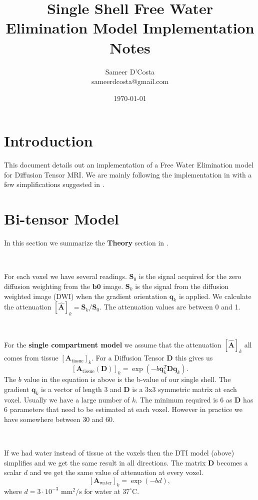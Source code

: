 \documentclass[12pt]{article}
\title{Single Shell Free Water Elimination Model Implementation Notes
}
\author{
  Sameer D'Costa \\
    sameerdcosta@gmail.com
}
\date{\today}
\newcommand{\vect}[1]{\mathbf{#1}}
\begin{document}
\maketitle

\section{Introduction}
This document details out an implementation of a Free Water Elimination model
for Diffusion Tensor MRI. We are mainly following the implementation in
\cite{Pasternak2009} with a few simplifications suggested in \cite{Pasternak2014}.

\section{Bi-tensor Model}
In this section we summarize the \textbf{Theory} section in
\cite{Pasternak2009}. 

\ 

\noindent
For each voxel we have several readings. $\vect{S}_0$ is the signal acquired
for the zero diffusion weighting from the $\vect{b0}$ image. $\vect{S}_k$ is
the signal from the diffusion weighted image (DWI) when the gradient
orientation $\vect{q}_k$ is applied. We calculate the attenuation
$[\hat{\vect{A}}]_k = \vect{S}_k / \vect{S}_0$. The attenuation values are
between 0 and 1. 

\ 

\noindent
For the \textbf{single compartment model} we assume that the attenuation
$[\hat{\vect{A}}]_k$ all comes from tissue $[\vect{A}_{\text{tissue}}]_k$. For a Diffusion Tensor $\vect{D}$ this gives us 
$$[\vect{A}_{\text{tissue}}(\vect{D})]_k = \exp(-b
\vect{q}_k^T\vect{D}\vect{q}_k).$$
The $b$ value in the equation is above is the b-value of our single shell. The
gradient $\vect{q}_k$ is a vector of length 3 and $\vect{D}$ is a 3x3 symmetric
matrix at each voxel. Usually we have a large number of $k$. The minimum
required is 6 as $\vect{D}$ has 6 parameters that need to be estimated at each
voxel.  However in practice we have somewhere between 30 and 60. 

\ 

\noindent
If we had water instead of tissue at the voxels then the DTI model (above)
simplifies and we get the same result in all directions. The matrix $\vect{D}$
becomes a scalar $d$ and we get the same value of attenuation at every voxel.
$$[\vect{A}_{\text{water}}]_k = \exp(-bd),$$
where $d = 3 \cdot 10^{-3}$ $\text{mm}^2/\text{s}$ for water at $37^\circ$C. 
\end{document}
